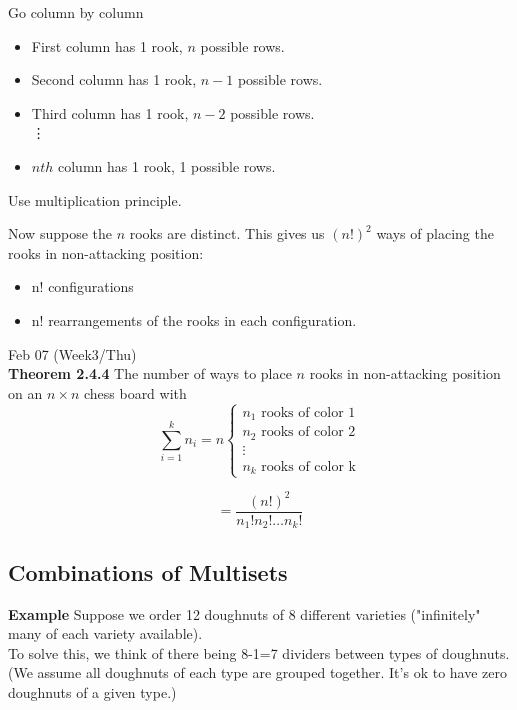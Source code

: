 \documentclass[12pt]{article}
\begin{document}
Go column by column
\begin{itemize}
    \item First column has 1 rook, $n$ possible rows.
    \item Second column has 1 rook, $n-1$ possible rows.
    \item Third column has 1 rook, $n-2$ possible rows.\\
    \qquad\qquad \vdots
    \item $nth$ column has 1 rook, 1 possible rows.
\end{itemize}
Use multiplication principle.

\vspace{2\baselineskip}
Now suppose the $n$ rooks are distinct. This gives us $(n!)^2$ ways of placing the rooks in non-attacking position:
\begin{itemize}
    \item n! configurations
    \item n! rearrangements of the rooks in each configuration.
\end{itemize}

\vspace{2\baselineskip}
Feb 07 (Week3/Thu)\\
{\bf Theorem 2.4.4} The number of ways to place $n$ rooks in non-attacking position on an $n\times n$ chess board with 
$$\sum_{i=1}^k n_i = n \begin{cases}
\text{$n_1$ rooks of color 1}\\
\text{$n_2$ rooks of color 2}\\
\vdots \\
\text{$n_k$ rooks of color k}
\end{cases}$$
 
$$=\frac{(n!)^2}{n_1!n_2!\ldots n_k!}$$

\subsection{Combinations of Multisets}
{\bf Example} Suppose we order 12 doughnuts of 8 different varieties ("infinitely" many of each variety available). \\

To solve this, we think of there being 8-1=7 dividers between types of doughnuts. (We assume all doughnuts of each type are grouped together. It's ok to have zero doughnuts of a given type.)\\
\end{document}
